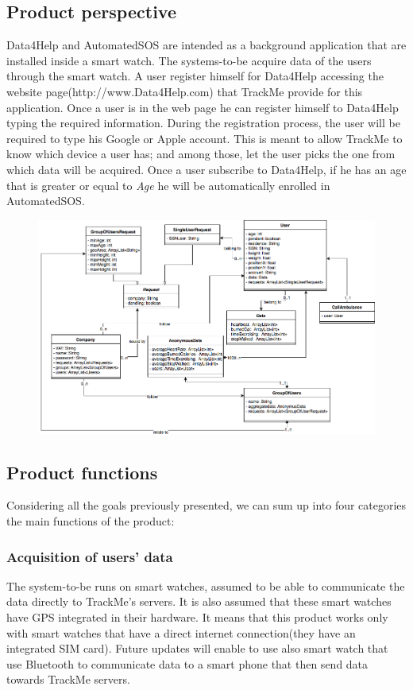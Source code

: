 \documentclass{article}
\begin{document}
\subsection{Product perspective}
Data4Help and AutomatedSOS are intended as a background application that are installed inside a smart watch. The systems-to-be acquire data of the users through the smart watch. A user register himself for Data4Help accessing the website page(http://www.Data4Help.com) that TrackMe provide for this application. Once a user is in the web page he can register himself to Data4Help typing the required information. During the registration process, the user will be required to type his Google or Apple account. This is meant to allow TrackMe to know which device a user has; and among those, let the user picks the one from which data will be acquired. Once a user subscribe to Data4Help, if he has an age that is greater or equal to \emph{Age} he will be automatically enrolled in AutomatedSOS.
\begin{figure}[h!]
\centering
    \textbf{}\par\medskip
	\includegraphics[width= \linewidth]{model.png}
\end{figure}
\subsection{Product functions}
Considering all the goals previously presented, we can sum up into four categories the main functions of the product: \newpage
\subsubsection{Acquisition of users' data}
The system-to-be runs on smart watches, assumed to be able to communicate the data directly to TrackMe's servers. It is also assumed that these smart watches have GPS integrated in their hardware. It means that this product works only with smart watches that have a direct internet connection(they have an integrated SIM card). Future updates will enable to use also smart watch that use Bluetooth to communicate data to a smart phone that then send data towards TrackMe servers.
\end{document}
